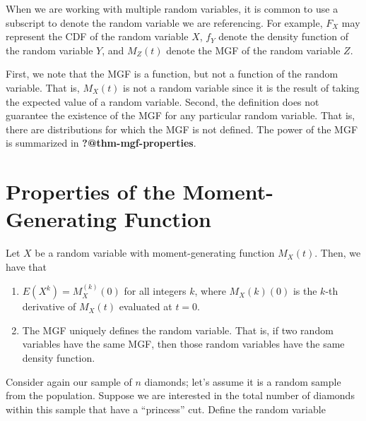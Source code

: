 \documentclass[
  letterpaper,
  DIV=11,
  numbers=noendperiod]{scrreprt}
\providecommand{\tightlist}{%
  \setlength{\itemsep}{0pt}\setlength{\parskip}{0pt}}\usepackage{longtable,booktabs,array}
\theoremstyle{definition}
\theoremstyle{plain}
\theoremstyle{definition}
\theoremstyle{remark}
\begin{document}
\begin{tcolorbox}[enhanced jigsaw, breakable, colframe=quarto-callout-note-color-frame, titlerule=0mm, arc=.35mm, coltitle=black, opacitybacktitle=0.6, leftrule=.75mm, opacityback=0, left=2mm, toprule=.15mm, colbacktitle=quarto-callout-note-color!10!white, title=\textcolor{quarto-callout-note-color}{\faInfo}\hspace{0.5em}{Note}, bottomtitle=1mm, toptitle=1mm, rightrule=.15mm, bottomrule=.15mm, colback=white]

When we are working with multiple random variables, it is common to use
a subscript to denote the random variable we are referencing. For
example, \(F_X\) may represent the CDF of the random variable \(X\),
\(f_Y\) denote the density function of the random variable \(Y\), and
\(M_Z(t)\) denote the MGF of the random variable \(Z\).

\end{tcolorbox}

First, we note that the MGF is a function, but not a function of the
random variable. That is, \(M_X(t)\) is not a random variable since it
is the result of taking the expected value of a random variable. Second,
the definition does not guarantee the existence of the MGF for any
particular random variable. That is, there are distributions for which
the MGF is not defined. The power of the MGF is summarized in
\textbf{?@thm-mgf-properties}.

\section{Properties of the Moment-Generating
Function}\label{properties-of-the-moment-generating-function}

Let \(X\) be a random variable with moment-generating function
\(M_X(t).\) Then, we have that

\begin{enumerate}
\def\labelenumi{\arabic{enumi}.}
\tightlist
\item
  \(E\left(X^k\right) = M_X^{(k)}(0)\) for all integers \(k\), where
  \(M_X(k)(0)\) is the \(k\)-th derivative of \(M_X(t)\) evaluated at
  \(t = 0\).
\item
  The MGF uniquely defines the random variable. That is, if two random
  variables have the same MGF, then those random variables have the same
  density function.
\end{enumerate}

Consider again our sample of \(n\) diamonds; let's assume it is a random
sample from the population. Suppose we are interested in the total
number of diamonds within this sample that have a ``princess'' cut.
Define the random variable
\end{document}
